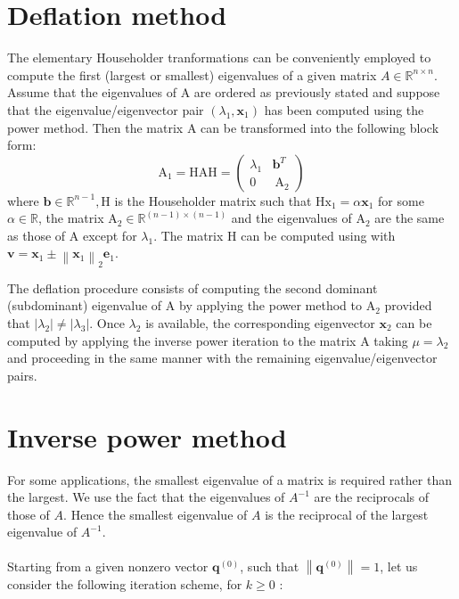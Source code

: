 \documentclass[11pt]{book}
\begin{document}
\section*{Deflation method}

The elementary Householder tranformations can be conveniently employed to compute the first (largest or smallest) eigenvalues of a given matrix $A \in \mathbb{R}^{n \times n}$. Assume that the eigenvalues of A are ordered as previously stated and suppose that the eigenvalue/eigenvector pair $\left(\lambda_1, \mathbf{x}_1\right)$ has been computed using the power method. Then the matrix A can be transformed into the following block form:
$$
\mathrm{A}_1=\mathrm{HAH}=\left(\begin{array}{ll}
\lambda_1 & \mathbf{b}^T \\
0 & \mathrm{~A}_2
\end{array}\right)
$$
where $\mathbf{b} \in \mathbb{R}^{n-1}, \mathrm{H}$ is the Householder matrix such that $\mathrm{Hx}_1=\alpha \mathbf{x}_1$ for some $\alpha \in \mathbb{R}$, the matrix $\mathrm{A}_2 \in \mathbb{R}^{(n-1) \times(n-1)}$ and the eigenvalues of $\mathrm{A}_2$ are the same as those of $\mathrm{A}$ except for $\lambda_1$. The matrix $\mathrm{H}$ can be computed using with $\mathbf{v}=\mathbf{x}_1 \pm\left\|\mathbf{x}_1\right\|_2 \mathbf{e}_1$.

The deflation procedure consists of computing the second dominant (subdominant) eigenvalue of $\mathrm{A}$ by applying the power method to $\mathrm{A}_2$ provided that $\left|\lambda_2\right| \neq\left|\lambda_3\right|$. Once $\lambda_2$ is available, the corresponding eigenvector $\mathbf{x}_2$ can be computed by applying the inverse power iteration to the matrix $\mathrm{A}$ taking $\mu=\lambda_2$  and proceeding in the same manner with the remaining eigenvalue/eigenvector pairs. 

\section*{Inverse power method}
For some applications, the smallest eigenvalue of a matrix is required rather than the largest. We use the fact that the eigenvalues of $A^{-1}$ are the reciprocals of those of $A$.
Hence the smallest eigenvalue of $A$ is the reciprocal of the largest eigenvalue of $A^{-1}$.\\ \\
Starting from a given nonzero vector $\mathbf{q}^{(0)}$, such that $\left\|\mathbf{q}^{(0)}\right\|=1$, let us consider the following iteration scheme, for $k \geq 0$ :
\end{document}

